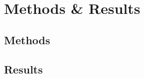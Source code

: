 \section{Methods \& Results}
\label{sec:methods-results}

\subsection{Methods}
\label{sec:methods}


\subsection{Results}
\label{sec:Results}

